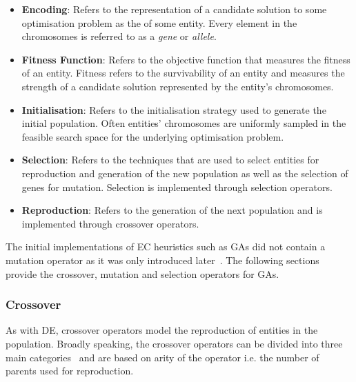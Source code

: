 \begin{itemize}
      \item \textbf{Encoding}: Refers to the representation of a candidate solution to some optimisation problem as the  of some entity. Every element in the chromosomes is referred to as a \textit{gene} or \textit{allele}.

      \item \textbf{Fitness Function}: Refers to the objective function that measures the fitness of an entity. Fitness refers to the survivability of an entity and measures the strength of a candidate solution represented by the entity's chromosomes.

      \item \textbf{Initialisation}: Refers to the initialisation strategy used to generate the initial population. Often entities' chromosomes are uniformly sampled in the feasible search space for the underlying optimisation problem.

      \item \textbf{Selection}: Refers to the techniques that are used to select entities for reproduction and generation of the new population as well as the selection of genes for mutation. Selection is implemented through selection operators.

      \item \textbf{Reproduction}: Refers to the generation of the next population and is implemented through crossover operators.
\end{itemize}

The initial implementations of \acs{EC} heuristics such as \acp{GA} did not contain a mutation operator as it was only introduced later~\cite{ref:engelbrecht:2007}. The following sections provide the crossover, mutation and selection operators for \acp{GA}.

\subsubsection{Crossover}\label{sec:heuristics:mh:ga:crossover}

As with \acs{DE}, crossover operators model the reproduction of entities in the population. Broadly speaking, the crossover operators can be divided into three main categories~\cite{ref:engelbrecht:2007} and are based on arity of the operator i.e. the number of parents used for reproduction.

